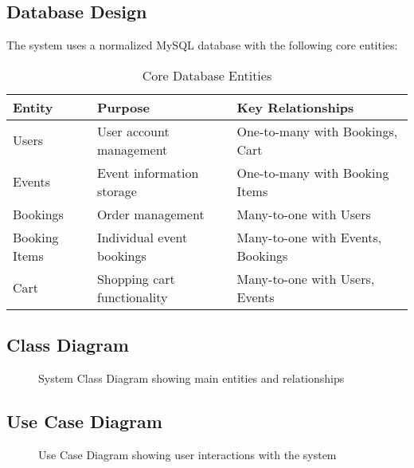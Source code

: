 \documentclass[12pt,a4paper]{article}
\begin{document}
\subsection{Database Design}

The system uses a normalized MySQL database with the following core entities:

\begin{table}[H]
\centering
\begin{tabular}{|l|l|l|}
\hline
\textbf{Entity} & \textbf{Purpose} & \textbf{Key Relationships} \\
\hline
Users & User account management & One-to-many with Bookings, Cart \\
Events & Event information storage & One-to-many with Booking Items \\
Bookings & Order management & Many-to-one with Users \\
Booking Items & Individual event bookings & Many-to-one with Events, Bookings \\
Cart & Shopping cart functionality & Many-to-one with Users, Events \\
\hline
\end{tabular}
\caption{Core Database Entities}
\end{table}

\subsection{Class Diagram}
\begin{figure}[H]
    \centering
    \caption{System Class Diagram showing main entities and relationships}
    \label{fig:class-diagram}
\end{figure}

\subsection{Use Case Diagram}
\begin{figure}[H]
    \centering
    \caption{Use Case Diagram showing user interactions with the system}
    \label{fig:usecase-diagram}
\end{figure}
\end{document}
